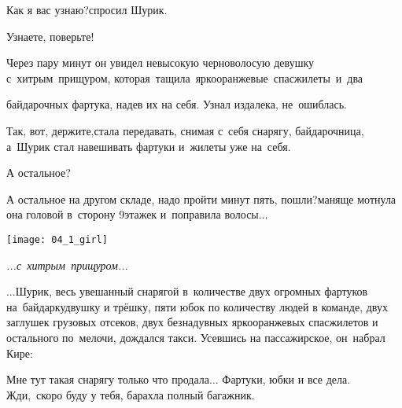 \diagdash Как я вас узнаю?\mdash спросил Шурик.

\diagdash Узнаете, поверьте!


\begingroup
\justifying
\parfillskip=0pt %
	
Через пару минут он увидел невысокую черноволосую девушку с~хитрым~прищуром, которая~тащила~ярко\sdash оранжевые~спасжилеты~и~два 

\par
\endgroup

\noindent
\begin{minipage}{0.55\textwidth}
	\setlength{\parindent}{1.0cm}  %
	\setlength{\parskip}{0.25cm}     %
	
	\noindent байдарочных фартука, надев их на себя. Узнал издалека, не~ошиблась.
	
	\diagdash Так, вот, держите,\mdash стала передавать, снимая с~себя снарягу, байдарочница, а~Шурик стал навешивать фартуки и~жилеты уже на~себя.
	
	\diagdash А остальное?	
	
	\diagdash А остальное на другом складе, надо пройти минут пять, пошли?\mdash маняще мотнула она головой в~сторону 9\sdash этажек и~поправила волосы$\ldots$
\end{minipage}\hfill
\begin{minipage}{0.40\textwidth}
	\centering
	\texttt{[image: 04\_1\_girl]}
	
	{\small\textit{...с~хитрым~прищуром...}}
\end{minipage}


\vspace{0.5cm}
$\ldots$Шурик, весь увешанный снарягой в~количестве двух огромных фартуков на~байдарку\sdash двушку и трёшку, пяти юбок по количеству людей в команде, двух заглушек грузовых отсеков, двух безнадувных ярко\sdash оранжевых спасжилетов и остального по~мелочи, дождался такси. Усевшись на пассажирское, он~набрал Кире:

\diagdash Мне тут такая снарягу только что продала$\ldots$ Фартуки, юбки и все дела. Жди,~скоро буду у тебя, барахла полный багажник.

